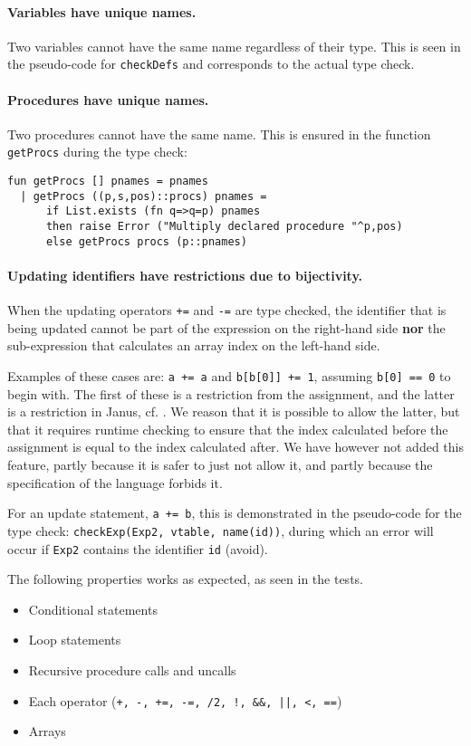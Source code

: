 \paragraph{Variables have unique names.} Two variables cannot have the same name
regardless of their type. This is seen in the pseudo-code for \verb+checkDefs+
and corresponds to the actual type check.

\paragraph{Procedures have unique names.} Two procedures cannot have the same
name. This is ensured in the function \verb+getProcs+ during the type check:

\begin{verbatim}
fun getProcs [] pnames = pnames
  | getProcs ((p,s,pos)::procs) pnames =
      if List.exists (fn q=>q=p) pnames
      then raise Error ("Multiply declared procedure "^p,pos)
      else getProcs procs (p::pnames)
\end{verbatim}

\paragraph{Updating identifiers have restrictions due to bijectivity.} When the
updating operators \verb!+=! and \verb!-=! are type checked, the identifier that
is being updated cannot be part of the expression on the right-hand side {\bf
nor} the sub-expression that calculates an array index on the left-hand side.

Examples of these cases are: \verb!a += a! and \verb!b[b[0]] += 1!, assuming
\verb!b[0] == 0! to begin with. The first of these is a restriction from the
assignment, and the latter is a restriction in Janus, cf. \cite[ch.
2.1]{yokoyama}. We reason that it is possible to allow the latter, but that it
requires runtime checking to ensure that the index calculated before the
assignment is equal to the index calculated after. We have however not added
this feature, partly because it is safer to just not allow it, and partly
because the specification of the language forbids it.

For an update statement, \verb!a += b!, this is demonstrated in the pseudo-code
for the type check: \verb+checkExp(Exp2, vtable, name(id))+, during which an
error will occur if \verb+Exp2+ contains the identifier \verb+id+ (avoid).

\vspace{0.2cm}
The following properties works as expected, as seen in the tests.
\begin{itemize}
\item Conditional statements
\item Loop statements
\item Recursive procedure calls and uncalls
\item Each operator ({\tt +, -, +=, -=, /2, !, \&\&, ||,  <, ==})
\item Arrays
\end{itemize}
